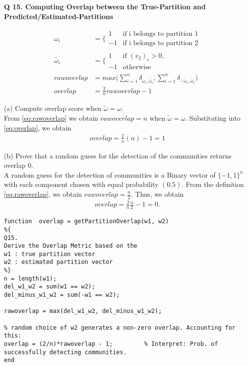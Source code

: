\documentclass[9pt]{article}
\begin{document}
\textbf{Q 15. Computing Overlap between the True-Partition and Predicted/Estimated-Partitions} 

\begin{align}
\omega_i &= \bigg\lbrace \begin{array}{cc}
1 & \text{if i belongs to partition 1}\\
-1 & \text{if i belongs to partition 2}
\end{array} \label{eq:truePartition}\\
\tilde{\omega_i}&= \bigg\lbrace \begin{array}{cc}
1 & \text{if } (v_2)_i > 0,\\
-1 & \text{otherwise}
\end{array} \label{eq:estPartition}\\ 
rawoverlap &= max \bigg( \sum_{i=1}^n  \delta_{\omega_i, \tilde{\omega_i}} ,  \sum_{i=1}^n  \delta_{-\omega_i, \tilde{\omega_i}}   \bigg) \label{eq:rawoverlap}\\
overlap &= \frac{2}{n}rawoverlap - 1 \label{eq:overlap}
\end{align}

(a) Compute overlap score when $\tilde{\omega} = \omega$.\\

From \eqref{eq:rawoverlap} we obtain $rawoverlap = n$ when $\tilde{\omega} = \omega$. Substituting into \eqref{eq:overlap}, we obtain
\begin{align*}
overlap = \frac{2}{n}(n) - 1 = 1
\end{align*}

(b) Prove that a random guess for the detection of the communities returns overlap 0.\\
A random guess for the detection of communities is a Binary vector of $\{-1,1\}^n$ with each component chosen with equal probability $(0.5)$. From the definition \eqref{eq:rawoverlap}, we obtain $rawoverlap = \frac{n}{2}$. Thus, we obtain
\begin{align*}
overlap = \frac{2}{n}\frac{n}{2}  - 1 = 0.
\end{align*}

\begin{lstlisting}
function  overlap = getPartitionOverlap(w1, w2)
%{
Q15. 
Derive the Overlap Metric based on the 
w1 : true partition vector
w2 : estimated partition vector
%}
n = length(w1);
del_w1_w2 = sum(w1 == w2);
del_minus_w1_w2 = sum(-w1 == w2);

rawoverlap = max(del_w1_w2, del_minus_w1_w2);

% random choice of w2 generates a non-zero overlap. Accounting for this:
overlap = (2/n)*rawoverlap - 1;         % Interpret: Prob. of successfully detecting communities.
end

\end{lstlisting}
\end{document}
